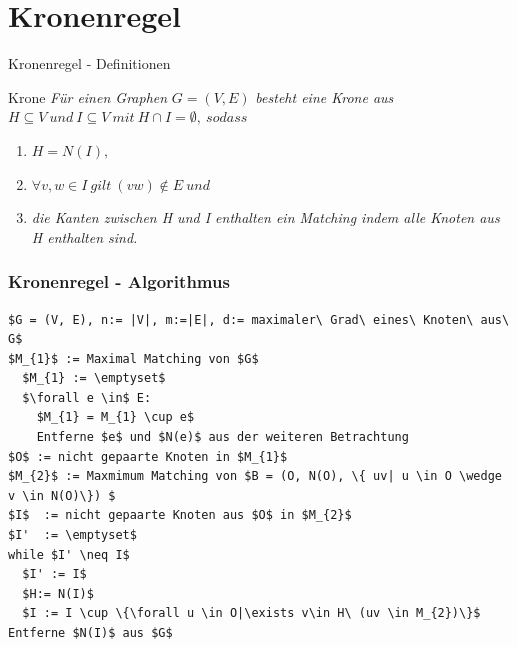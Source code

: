 \documentclass{beamer}
\begin{document}
\section{Kronenregel}

\begin{frame}{Kronenregel - Definitionen}
\begin{block}{Krone} 
\textit{Für einen Graphen} $G=(V,E)$ \textit{besteht eine Krone aus} $H \subseteq V\ und\ I \subseteq V\ mit\ H \cap I = \emptyset,\ sodass$  
\begin{enumerate}
\item $H = N(I),$  
\item $\forall v, w \in I\ gilt\ (vw) \notin E\ und$ 
\item \textit{die Kanten zwischen H und I enthalten ein Matching indem alle Knoten aus H enthalten sind.}
\end{enumerate}
\end{block}
\end{frame}

\begin{frame}[fragile]
\frametitle{Kronenregel - Algorithmus}
\begin{lstlisting}[mathescape=true, escapechar = !,basicstyle=\ttfamily\scriptsize]
$G = (V, E), n:= |V|, m:=|E|, d:= maximaler\ Grad\ eines\ Knoten\ aus\ G$ 
$M_{1}$ := Maximal Matching von $G$ 
  $M_{1} := \emptyset$
  $\forall e \in$ E:	 
    $M_{1} = M_{1} \cup e$  
    Entferne $e$ und $N(e)$ aus der weiteren Betrachtung 
$O$ := nicht gepaarte Knoten in $M_{1}$ 
$M_{2}$ := Maxmimum Matching von $B = (O, N(O), \{ uv| u \in O \wedge v \in N(O)\}) $ 
$I$  := nicht gepaarte Knoten aus $O$ in $M_{2}$ 
$I'  := \emptyset$ 
while $I' \neq I$ 
  $I' := I$ 
  $H:= N(I)$ 
  $I := I \cup \{\forall u \in O|\exists v\in H\ (uv \in M_{2})\}$ 
Entferne $N(I)$ aus $G$ 
\end{lstlisting}
\end{frame}
\end{document}
